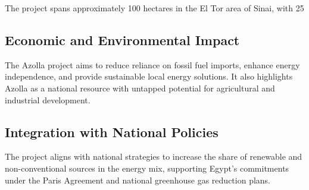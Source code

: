 The project spans approximately 100 hectares in the El Tor area of Sinai, with 25%

\subsection{Economic and Environmental Impact}

The Azolla project aims to reduce reliance on fossil fuel imports, enhance energy independence, and provide sustainable local energy solutions. It also highlights Azolla as a national resource with untapped potential for agricultural and industrial development.

\subsection{Integration with National Policies}

The project aligns with national strategies to increase the share of renewable and non-conventional sources in the energy mix, supporting Egypt's commitments under the Paris Agreement and national greenhouse gas reduction plans.
